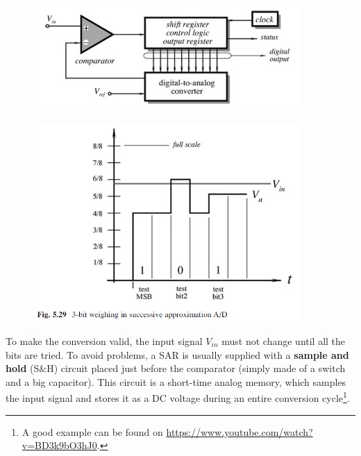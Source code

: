 \begin{minipage}[c]{0.45\linewidth}
\begin{figure}[H]
    \centering
    \includegraphics[width =  0.9\textwidth]{L5/img/SAR.PNG}
\end{figure}
\end{minipage}\hfill
\begin{minipage}[c]{0.45 \linewidth}
\begin{figure}[H]
    \centering
    \includegraphics[width =  0.9\textwidth]{L5/img/SAR-graph.PNG}
\end{figure}
\end{minipage}

To make the conversion valid, the input signal $V_{in}$ must not change until all the
bits are tried. To avoid problems, a SAR
is usually supplied with a \textbf{sample and hold} (S\&H) circuit placed just before the comparator (simply made of a switch and a big capacitor). This circuit is a short-time analog memory, which samples the input signal and stores it as a DC voltage during an entire conversion cycle\footnote{A good example can be found on \href{https://www.youtube.com/watch?v=BD3k9bO3hJ0}{https://www.youtube.com/watch?v=BD3k9bO3hJ0}.}. 

